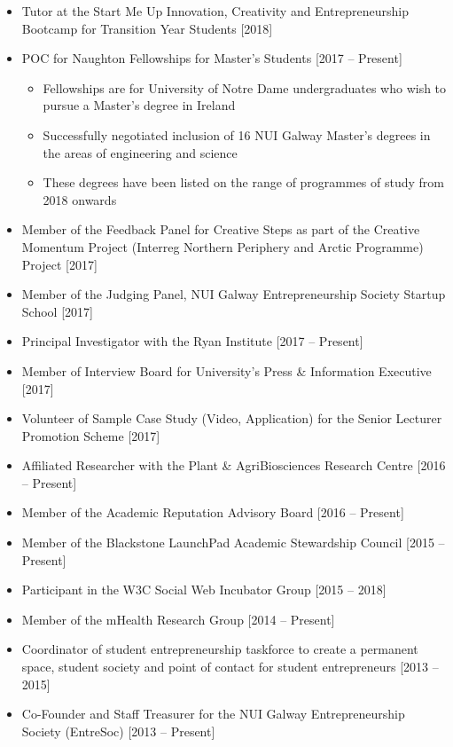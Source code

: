 \documentclass[10pt,a4paper]{res} %
\begin{document}
\begin{resume}
\begin{itemize} \itemsep -2pt
\item Tutor at the Start Me Up Innovation, Creativity and Entrepreneurship Bootcamp for Transition Year Students [2018]
\item POC for Naughton Fellowships for Master's Students [2017 -- Present]
\begin{itemize} \itemsep -2pt
\item Fellowships are for University of Notre Dame undergraduates who wish to pursue a Master's degree in Ireland
\item Successfully negotiated inclusion of 16 NUI Galway Master's degrees in the areas of engineering and science
\item These degrees have been listed on the range of programmes of study from 2018 onwards
\end{itemize}
\item Member of the Feedback Panel for Creative Steps as part of the Creative Momentum Project (Interreg Northern Periphery and Arctic Programme) Project [2017]
\item Member of the Judging Panel, NUI Galway Entrepreneurship Society Startup School [2017]
\item Principal Investigator with the Ryan Institute [2017 -- Present]
\item Member of Interview Board for University's Press \& Information Executive [2017]
\item Volunteer of Sample Case Study (Video, Application) for the Senior Lecturer Promotion Scheme [2017]
\item Affiliated Researcher with the Plant \& AgriBiosciences Research Centre [2016 -- Present]
\item Member of the Academic Reputation Advisory Board [2016 -- Present]
\item Member of the Blackstone LaunchPad Academic Stewardship Council [2015 -- Present]
\item Participant in the W3C Social Web Incubator Group [2015 -- 2018]
\item Member of the mHealth Research Group [2014 -- Present]
\item Coordinator of student entrepreneurship taskforce to create a permanent space, student society and point of contact for student entrepreneurs [2013 -- 2015]
\item Co-Founder and Staff Treasurer for the NUI Galway Entrepreneurship Society (EntreSoc) [2013 -- Present]
\begin{itemize} \itemsep -2pt

\end{itemize}
\end{itemize}
\end{resume}
\end{document}
